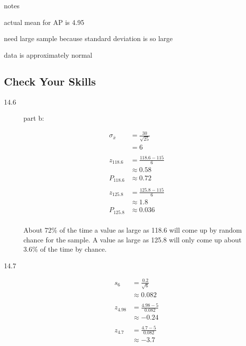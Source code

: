 \documentclass[letterpaper, landscape]{exam}
\begin{document}
  notes
  \begin{itemize*}
    \item actual mean for AP is 4.95
    \item need large sample because standard deviation is so large
    \item data is approximately normal
  \end{itemize*}

  \subsection{Check Your Skills}
  \begin{description}
    \item[14.6]

      part b:

      \begin{align*}
        \sigma_{\bar{x}} & = \frac{30}{\sqrt{25}} \\
                         & = 6 \\
        \\
        z_{118.6}        & = \frac{118.6 - 115}{6} \\
                         & \approx 0.58 \\
        P_{118.6}        & \approx 0.72 \\
        \\
        z_{125.8}        & = \frac{125.8 - 115}{6} \\
                         & \approx 1.8 \\
        P_{125.8}        & \approx 0.036 \\
      \end{align*}

      About 72\% of the time a value as large as 118.6 will come up by random
      chance for the sample. A value as large as 125.8 will only come up about
      3.6\% of the time by chance.

    \item[14.7]
      \begin{align*}
        s_6 &= \frac{0.2}{\sqrt{6}} \\
        &\approx 0.082 \\
        \\
        z_{4.98} & = \frac{4.98 - 5}{0.082} \\
                 & \approx -0.24 \\
        \\
        z_{4.7} & = \frac{4.7 - 5}{0.082} \\
                & \approx -3.7 \\
      \end{align*}
  \end{description}
\end{document}
